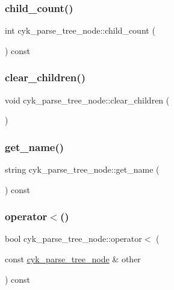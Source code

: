 \subsubsection{\texorpdfstring{child\_count()}{child\_count()}}
{\footnotesize\ttfamily int cyk\+\_\+parse\+\_\+tree\+\_\+node\+::child\+\_\+count (\begin{DoxyParamCaption}{ }\end{DoxyParamCaption}) const}

\mbox{\label{classcyk__parse__tree__node_a38b760ecf7aa2fa860847eed6819aedb}} 
\subsubsection{\texorpdfstring{clear\_children()}{clear\_children()}}
{\footnotesize\ttfamily void cyk\+\_\+parse\+\_\+tree\+\_\+node\+::clear\+\_\+children (\begin{DoxyParamCaption}{ }\end{DoxyParamCaption})}

\mbox{\label{classcyk__parse__tree__node_af00f172bdcce590c066d408db94148e0}} 
\subsubsection{\texorpdfstring{get\_name()}{get\_name()}}
{\footnotesize\ttfamily string cyk\+\_\+parse\+\_\+tree\+\_\+node\+::get\+\_\+name (\begin{DoxyParamCaption}{ }\end{DoxyParamCaption}) const}

\mbox{\label{classcyk__parse__tree__node_a49838a9041ce5c10f22fa14f5993723c}} 
\subsubsection{\texorpdfstring{operator$<$()}{operator<()}}
{\footnotesize\ttfamily bool cyk\+\_\+parse\+\_\+tree\+\_\+node\+::operator$<$ (\begin{DoxyParamCaption}\item[{const \mbox{\hyperlink{classcyk__parse__tree__node}{cyk\+\_\+parse\+\_\+tree\+\_\+node}} \&}]{other }\end{DoxyParamCaption}) const}

